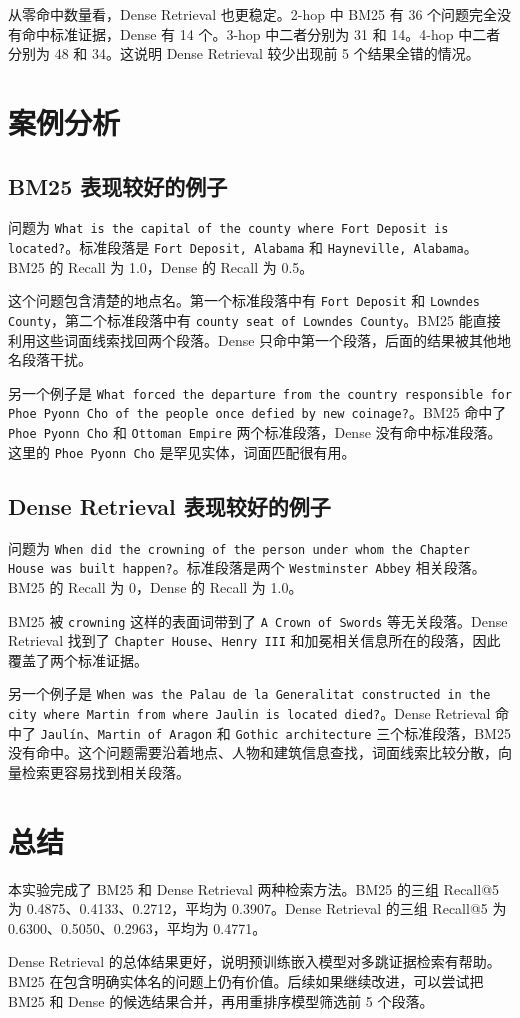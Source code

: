 \documentclass[12pt,letterpaper]{article}
\begin{document}
从零命中数量看，Dense Retrieval 也更稳定。2-hop 中 BM25 有 36 个问题完全没有命中标准证据，Dense 有 14 个。3-hop 中二者分别为 31 和 14。4-hop 中二者分别为 48 和 34。这说明 Dense Retrieval 较少出现前 5 个结果全错的情况。

\section{案例分析}

\subsection{BM25 表现较好的例子}

问题为 \texttt{What is the capital of the county where Fort Deposit is located?}。标准段落是 \texttt{Fort Deposit, Alabama} 和 \texttt{Hayneville, Alabama}。BM25 的 Recall 为 1.0，Dense 的 Recall 为 0.5。

这个问题包含清楚的地点名。第一个标准段落中有 \texttt{Fort Deposit} 和 \texttt{Lowndes County}，第二个标准段落中有 \texttt{county seat of Lowndes County}。BM25 能直接利用这些词面线索找回两个段落。Dense 只命中第一个段落，后面的结果被其他地名段落干扰。

另一个例子是 \texttt{What forced the departure from the country responsible for Phoe Pyonn Cho of the people once defied by new coinage?}。BM25 命中了 \texttt{Phoe Pyonn Cho} 和 \texttt{Ottoman Empire} 两个标准段落，Dense 没有命中标准段落。这里的 \texttt{Phoe Pyonn Cho} 是罕见实体，词面匹配很有用。

\subsection{Dense Retrieval 表现较好的例子}

问题为 \texttt{When did the crowning of the person under whom the Chapter House was built happen?}。标准段落是两个 \texttt{Westminster Abbey} 相关段落。BM25 的 Recall 为 0，Dense 的 Recall 为 1.0。

BM25 被 \texttt{crowning} 这样的表面词带到了 \texttt{A Crown of Swords} 等无关段落。Dense Retrieval 找到了 \texttt{Chapter House}、\texttt{Henry III} 和加冕相关信息所在的段落，因此覆盖了两个标准证据。

另一个例子是 \texttt{When was the Palau de la Generalitat constructed in the city where Martin from where Jaulin is located died?}。Dense Retrieval 命中了 \texttt{Jaulín}、\texttt{Martin of Aragon} 和 \texttt{Gothic architecture} 三个标准段落，BM25 没有命中。这个问题需要沿着地点、人物和建筑信息查找，词面线索比较分散，向量检索更容易找到相关段落。

\section{总结}

本实验完成了 BM25 和 Dense Retrieval 两种检索方法。BM25 的三组 Recall@5 为 0.4875、0.4133、0.2712，平均为 0.3907。Dense Retrieval 的三组 Recall@5 为 0.6300、0.5050、0.2963，平均为 0.4771。

Dense Retrieval 的总体结果更好，说明预训练嵌入模型对多跳证据检索有帮助。BM25 在包含明确实体名的问题上仍有价值。后续如果继续改进，可以尝试把 BM25 和 Dense 的候选结果合并，再用重排序模型筛选前 5 个段落。
\end{document}
